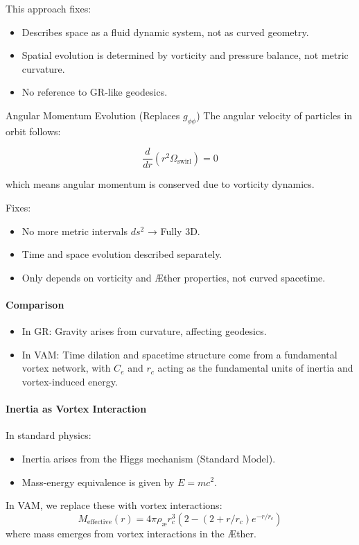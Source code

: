 This approach fixes:

\begin{itemize}
\item Describes space as a fluid dynamic system, not as curved geometry.
\item Spatial evolution is determined by vorticity and pressure balance, not metric curvature.
\item No reference to GR-like geodesics.
\end{itemize}


Angular Momentum Evolution (Replaces $g_{\phi\phi}$)
The angular velocity of particles in orbit follows:

\begin{equation*}
    \frac{d}{dr} \left( r^2 \Omega_{\text{swirl}} \right) = 0
\end{equation*}

which means angular momentum is conserved due to vorticity dynamics.

Fixes:

\begin{itemize}
\item No more metric intervals $ ds^2 $ → Fully 3D.
\item Time and space evolution described separately.
\item Only depends on vorticity and Æther properties, not curved spacetime.
\end{itemize}



\paragraph{Comparison}
\begin{itemize}
    \item In GR: Gravity arises from curvature, affecting geodesics.
    \item In VAM: Time dilation and spacetime structure come from a fundamental vortex network, with $C_e$ and $r_c$ acting as the fundamental units of inertia and vortex-induced energy.
\end{itemize}

\paragraph{Inertia as Vortex Interaction}
In standard physics:
\begin{itemize}
    \item Inertia arises from the Higgs mechanism (Standard Model).
    \item Mass-energy equivalence is given by $E = mc^2$.
\end{itemize}
In VAM, we replace these with vortex interactions:
\begin{equation*}
    M_{\text{effective}}(r) = 4\pi \rho_\text{\ae} r_c^3 \left( 2 - (2 + r/r_c) e^{-r / r_c} \right)
\end{equation*}
where mass emerges from vortex interactions in the Æther.

